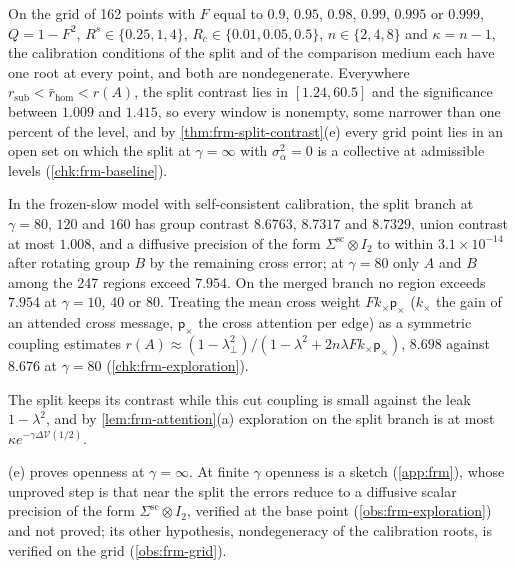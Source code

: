 \begin{observation}\label{obs:frm-grid}
On the grid of 162 points with $F$ equal to $0.9$, $0.95$, $0.98$, $0.99$, $0.995$ or $0.999$, $Q=1-F^2$, $R^s\in\{0.25,1,4\}$, $R_c\in\{0.01,0.05,0.5\}$, $n\in\{2,4,8\}$ and $\kappa=n-1$, the calibration conditions of the split and of the comparison medium each have one root at every point, and both are nondegenerate. Everywhere $r_{\mathrm{sub}}<\bar r_{\mathrm{hom}}<r(A)$, the split contrast lies in $[1.24,60.5]$ and the significance between $1.009$ and $1.415$, so every window is nonempty, some narrower than one percent of the level, and by \cref{thm:frm-split-contrast}(e) every grid point lies in an open set on which the split at $\gamma=\infty$ with $\sigma_\alpha^2=0$ is a collective at admissible levels (\cref{chk:frm-baseline}).
\end{observation}

\begin{observation}\label{obs:frm-exploration}
In the frozen-slow model with self-consistent calibration, the split branch at $\gamma=80$, $120$ and $160$ has group contrast $8.6763$, $8.7317$ and $8.7329$, union contrast at most $1.008$, and a diffusive precision of the form $\Sigma^{\mathrm{sc}}\otimes I_2$ to within $3.1\times10^{-14}$ after rotating group $B$ by the remaining cross error; at $\gamma=80$ only $A$ and $B$ among the 247 regions exceed $7.954$. On the merged branch no region exceeds $7.954$ at $\gamma=10$, $40$ or $80$. Treating the mean cross weight $Fk_\times\mathsf p_\times$ ($k_\times$ the gain of an attended cross message, $\mathsf p_\times$ the cross attention per edge) as a symmetric coupling estimates $r(A)\approx(1-\lambda_\perp^2)/(1-\lambda^2+2n\lambda Fk_\times\mathsf p_\times)$, $8.698$ against $8.676$ at $\gamma=80$ (\cref{chk:frm-exploration}).
\end{observation}
The split keeps its contrast while this cut coupling is small against the leak $1-\lambda^2$, and by \cref{lem:frm-attention}(a) exploration on the split branch is at most $\kappa e^{-\gamma\Delta\mathcal V(1/2)}$.

\begin{remark}\label{rem:frm-open}
(e) proves openness at $\gamma=\infty$. At finite $\gamma$ openness is a sketch (\cref{app:frm}), whose unproved step is that near the split the errors reduce to a diffusive scalar precision of the form $\Sigma^{\mathrm{sc}}\otimes I_2$, verified at the base point (\cref{obs:frm-exploration}) and not proved; its other hypothesis, nondegeneracy of the calibration roots, is verified on the grid (\cref{obs:frm-grid}).
\end{remark}

